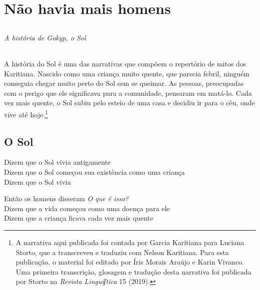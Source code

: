 \part{Não havia mais homens}

\chapter*{}
\thispagestyle{empty}

\vspace*{\fill}
\paragraph{A história de Gokyp, o Sol} A história do Sol é uma das narrativas que compõem o repertório de mitos dos Karitiana. Nascido como uma criança muito quente, que parecia febril, ninguém conseguia chegar muito perto do Sol sem se queimar. As
pessoas, preocupadas com o perigo que ele significava para a comunidade,
pensaram em matá-lo. Cada vez mais quente, o Sol subiu pelo esteio de
uma casa e decidiu ir para o céu, onde vive até hoje.\footnote{A narrativa aqui publicada foi contada por Garcia Karitiana para Luciana Storto, que a transcreveu e traduziu com Nelson Karitiana. Para esta
publicação, o material foi editado por Íris Morais Araújo e Karin
Vivanco. Uma primeira transcrição, glosagem e tradução desta narrativa foi publicada por Storto na \textit{Revista Linguíʃtica} 15 (2019).}
\vspace*{\fill}

\chapter{O Sol}

Dizem que o Sol vivia antigamente\\
Dizem que o Sol começou sua existência como uma criança\\
Dizem que o Sol vivia

\smallskip
\begin{center}\end{center}
\smallskip

\noindent Então os homens disseram \textit{O que é isso?}\\
Dizem que a vida começou como uma doença para ele\\
Dizem que a criança ficava cada vez mais quente

